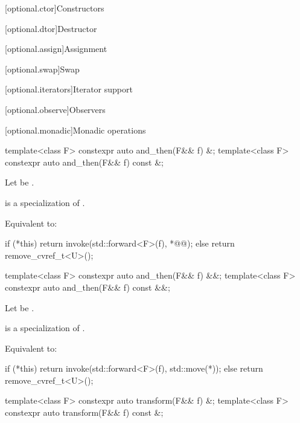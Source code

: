 [optional.ctor]{Constructors}


[optional.dtor]{Destructor}

[optional.assign]{Assignment}


[optional.swap]{Swap}

[optional.iterators]{Iterator support}

[optional.observe]{Observers}

[optional.monadic]{Monadic operations}

\begin{itemdecl}
template<class F> constexpr auto and_then(F&& f) &;
template<class F> constexpr auto and_then(F&& f) const &;
\end{itemdecl}

\begin{itemdescr}
\pnum
Let  be .

\pnum
\mandates
{} is a specialization of .

\pnum
\effects
Equivalent to:
\begin{codeblock}
if (*this) {
  return invoke(std::forward<F>(f), *@@);
} else {
  return remove_cvref_t<U>();
}
\end{codeblock}
\end{itemdescr}

\begin{itemdecl}
template<class F> constexpr auto and_then(F&& f) &&;
template<class F> constexpr auto and_then(F&& f) const &&;
\end{itemdecl}

\begin{itemdescr}
\pnum
Let  be .

\pnum
\mandates
{} is a specialization of .

\pnum
\effects
Equivalent to:
\begin{codeblock}
if (*this) {
  return invoke(std::forward<F>(f), std::move(*));
} else {
  return remove_cvref_t<U>();
}
\end{codeblock}
\end{itemdescr}

\begin{itemdecl}
template<class F> constexpr auto transform(F&& f) &;
template<class F> constexpr auto transform(F&& f) const &;
\end{itemdecl}


